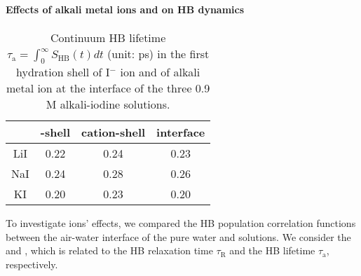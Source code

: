 \paragraph{Effects of alkali metal ions and \I on HB dynamics}
\begin{table}[H]
\centering
\caption{\label{tab:tau_hb_alkali_iodine} 
Continuum HB lifetime $\tau_{\text{a}}=\int_0^\infty S_\text{HB}(t) dt$ (unit: ps) in the first hydration shell of I$^-$ ion 
and of alkali metal ion at the interface of the three 0.9 M alkali-iodine solutions.}
\begin{tabular}{cccc}
  &\I-shell &cation-shell& interface \\
\hline
 LiI & 0.22 & 0.24 & 0.23\\
 NaI & 0.24 & 0.28 & 0.26\\
 KI  & 0.20 & 0.23 & 0.20\\
\end{tabular}
\end{table} 

To investigate ions' effects, we compared the HB population correlation functions between the air-water interface of the pure water and solutions.
We consider the \CHB and \SHB, which is related to the HB relaxation time $\tau_\text{R}$ and the HB lifetime $\tau_\text{a}$, respectively.

